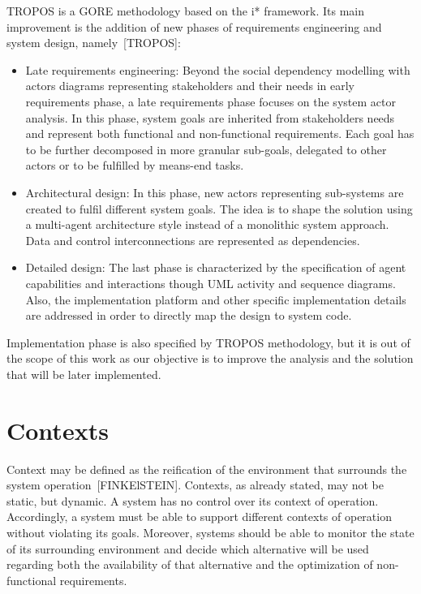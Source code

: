 TROPOS is a GORE methodology based on the i* framework. Its main improvement is the addition of new phases of requirements engineering and system design, namely~[TROPOS]:

\begin{itemize}

\item Late requirements engineering: Beyond the social dependency modelling with actors diagrams representing stakeholders and their needs in early requirements phase, a late requirements phase focuses on the system actor analysis. In this phase, system goals are inherited from stakeholders needs and represent both functional and non-functional requirements. Each goal has to be further decomposed in more granular sub-goals, delegated to other actors or to be fulfilled by means-end tasks. 
\medskip

\item Architectural design: In this phase, new actors representing sub-systems are created to fulfil different system goals. The idea is to shape the solution using a multi-agent architecture style instead of a monolithic system approach. Data and control interconnections are represented as dependencies.
\medskip

\item Detailed design: The last phase is characterized by the specification of agent capabilities and interactions though UML activity and sequence diagrams. Also, the implementation platform and other specific implementation details are addressed in order to directly map the design to system code.

\end{itemize}

Implementation phase is also specified by TROPOS methodology, but it is out of the scope of this work as our objective is to improve the analysis and the solution that will be later implemented.

\section{Contexts}

Context may be defined as the reification of the environment that surrounds the system operation~[FINKElSTEIN]. Contexts, as already stated, may not be static, but dynamic. A system has no control over its context of operation. Accordingly, a system must be able to support different contexts of operation without violating its goals. Moreover, systems should be able to monitor the state of its surrounding environment and decide which alternative will be used regarding both the availability of that alternative and the optimization of non-functional requirements.

